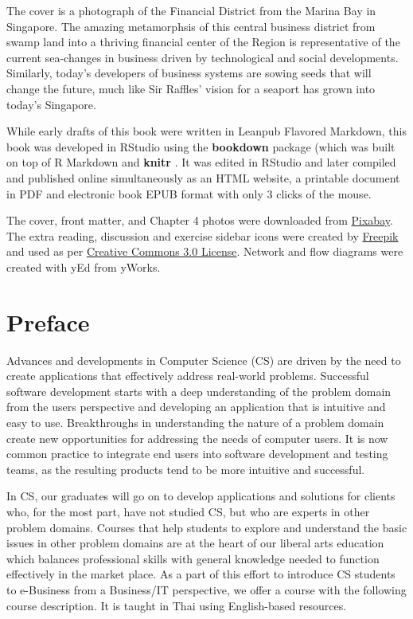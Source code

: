 \documentclass[]{book}
\begin{document}
The cover is a photograph of the Financial District from the Marina Bay in Singapore. The amazing metamorphsis of this central business district from swamp land into a thriving financial center of the Region is representative of the current sea-changes in business driven by technological and social developments. Similarly, today's developers of business systems are sowing seeds that will change the future, much like Sir Raffles' vision for a seaport has grown into today's Singapore.

While early drafts of this book were written in Leanpub Flavored Markdown, this book was developed in RStudio using the \textbf{bookdown} package \citep{R-bookdown} (which was built on top of R Markdown and \textbf{knitr} \citep{Xie2015}. It was edited in RStudio and later compiled and published online simultaneously as an HTML website, a printable document in PDF and electronic book EPUB format with only 3 clicks of the mouse.

The cover, front matter, and Chapter 4 photos were downloaded from \href{https://pixabay.com/images/search/singapore}{Pixabay}.
The extra reading, discussion and exercise sidebar icons were created by \href{https://www.freepik.com}{Freepik} and used as per \href{https://creativecommons.org/licenses/by/3.0}{Creative Commons 3.0 License}. Network and flow diagrams were created with yEd from yWorks. \citep{YED2018}

\newpage

\hypertarget{preface}{%
\chapter*{Preface}\label{preface}}

Advances and developments in Computer Science (CS) are driven by the need to create applications that effectively address real-world problems. Successful software development starts with a deep understanding of the problem domain from the users perspective and developing an application that is intuitive and easy to use. Breakthroughs in understanding the nature of a problem domain create new opportunities for addressing the needs of computer users. It is now common practice to integrate end users into software development and testing teams, as the resulting products tend to be more intuitive and successful.

In CS, our graduates will go on to develop applications and solutions for clients who, for the most part, have not studied CS, but who are experts in other problem domains. Courses that help students to explore and understand the basic issues in other problem domains are at the heart of our liberal arts education which balances professional skills with general knowledge needed to function effectively in the market place.
As a part of this effort to introduce CS students to e-Business from a Business/IT perspective, we offer a course with the following course description. It is taught in Thai using English-based resources.
\end{document}
